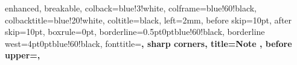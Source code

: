 \usepackage{tcolorbox}

 {
  enhanced,
  breakable,
  colback=blue!3!white,      
  colframe=blue!60!black,    
  colbacktitle=blue!20!white, 
  coltitle=black,            
  left=2mm,
  before skip=10pt,
  after skip=10pt,
  boxrule=0pt,
  borderline={0.5pt}{0pt}{blue!60!black},
  borderline west={4pt}{0pt}{blue!60!black},
  fonttitle=\bfseries,
  sharp corners,
  title={\textbf{Note } \label{note:\arabic{NoteCounter}}},
  before upper={},
}